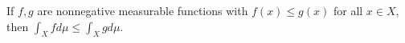If $f, g$ are nonnegative measurable functions with $f(x) \leq g(x)$ for all $x \in X$, then $\int_X f d\mu \leq \int_X g d\mu$.
